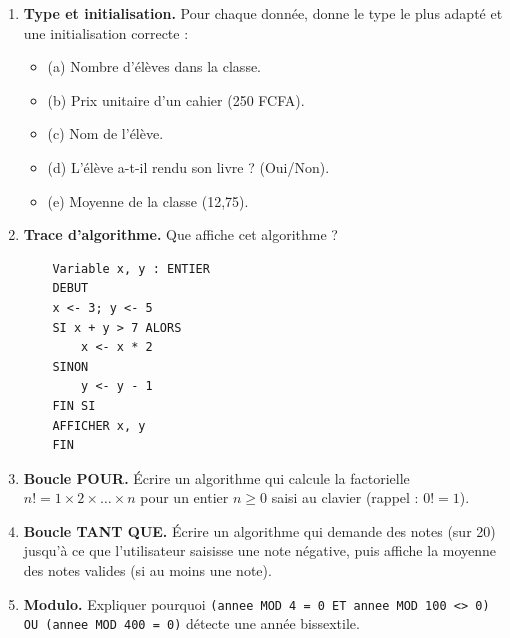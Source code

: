 \documentclass[11pt]{article}
\begin{document}
\begin{exercice}
\begin{enumerate}
    \item \textbf{Type et initialisation.} Pour chaque donnée, donne le type le plus adapté et une initialisation correcte :
    \begin{itemize}
        \item (a) Nombre d'élèves dans la classe.
        \item (b) Prix unitaire d'un cahier (250 FCFA).
        \item (c) Nom de l'élève.
        \item (d) L'élève a-t-il rendu son livre ? (Oui/Non).
        \item (e) Moyenne de la classe (12,75).
    \end{itemize}
    \item \textbf{Trace d'algorithme.} Que affiche cet algorithme ?
    \begin{lstlisting}
    Variable x, y : ENTIER
    DEBUT
    x <- 3; y <- 5
    SI x + y > 7 ALORS
        x <- x * 2
    SINON
        y <- y - 1
    FIN SI
    AFFICHER x, y
    FIN
    \end{lstlisting}
    \item \textbf{Boucle POUR.} Écrire un algorithme qui calcule la factorielle $n! = 1 \times 2 \times \dots \times n$ pour un entier $n \ge 0$ saisi au clavier (rappel : $0! = 1$).
    \item \textbf{Boucle TANT QUE.} Écrire un algorithme qui demande des notes (sur 20) jusqu'à ce que l'utilisateur saisisse une note négative, puis affiche la moyenne des notes valides (si au moins une note).
    \item \textbf{Modulo.} Expliquer pourquoi \texttt{(annee MOD 4 = 0 ET annee MOD 100 <> 0) OU (annee MOD 400 = 0)} détecte une année bissextile.
\end{enumerate}
\end{exercice}
\end{document}
